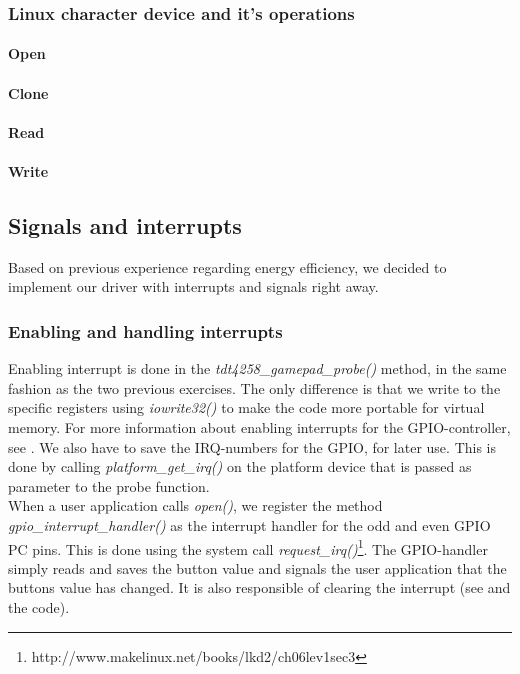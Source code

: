 \subsubsection{Linux character device and it's operations}


\paragraph{Open}
\paragraph{Clone}
\paragraph{Read}
\paragraph{Write}

\subsection{Signals and interrupts}
\label{subsection:signals-and-interrupts}
Based on previous experience regarding energy efficiency, we decided to implement our driver with interrupts and signals right away.
\subsubsection{Enabling and handling interrupts}

Enabling interrupt is done in the \emph{tdt4258\_gamepad\_probe()} method, in the same fashion as the two previous exercises. The only difference is that we write to the specific registers using \emph{iowrite32()} to make the code more portable for virtual memory. For more information about enabling interrupts for the GPIO-controller, see \cite[section 3]{compendium}. We also have to save the IRQ-numbers for the GPIO, for later use. This is done by calling \emph{platform\_get\_irq()} on the platform device that is passed as parameter to the probe function.\\

When a user application calls \emph{open()}, we register the method \emph{gpio\_interrupt\_handler()} as the interrupt handler for the odd and even GPIO PC pins. This is done using the system call \emph{request\_irq()}\footnote{http://www.makelinux.net/books/lkd2/ch06lev1sec3}. The GPIO-handler simply reads and saves the button value and signals the user application that the buttons value has changed. It is also responsible of clearing the interrupt (see \cite[section 3]{compendium} and the code).   

